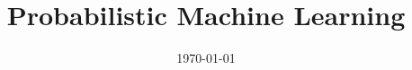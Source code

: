 \documentclass[a4paper,12pt]{report}
\institute{UniTs - University of Trieste}
\title{Probabilistic Machine Learning}
\date{\today}
\begin{document}
\maketitle



\toc


\printbibliography
\end{document}
